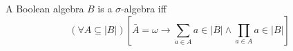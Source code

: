 A Boolean algebra $B$ is a $\sigma$-algebra iff
$$
(\forall A \subseteq |B|) \left[ \bar{A} = \omega \rightarrow \sum_{a \in A} a \in |B| \land \prod_{a \in A} a \in |B| \right]
$$
